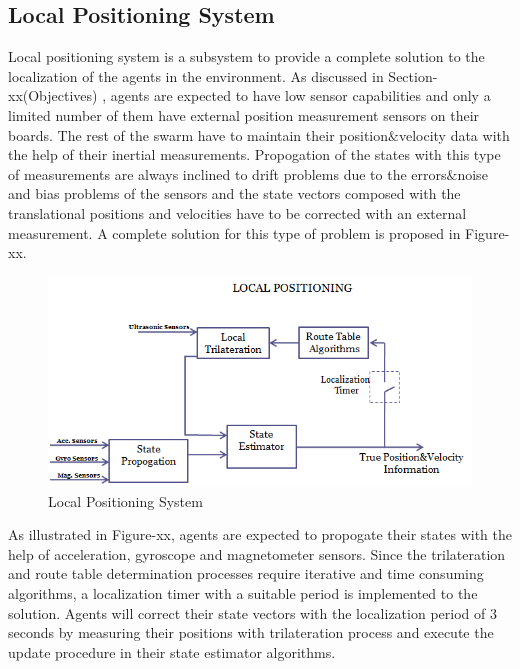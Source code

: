 \documentclass[twoside]{article}
\begin{document}
\subsection{Local Positioning System}

Local positioning system is a subsystem to provide a complete solution to the localization of the agents in the environment. As discussed in Section-xx(Objectives) , agents are expected to have low sensor capabilities and only a limited number of them have external position measurement sensors on their boards. The rest of the swarm have to maintain their position$\&$velocity data with the help of their inertial measurements. Propogation of the states with this type of measurements are always inclined to drift problems due to the errors$\&$noise and bias problems of the sensors and the state vectors composed with the translational positions and velocities have to be corrected with an external measurement. A complete solution for this type of problem is proposed in Figure-xx. 



\begin{figure}[H]
	\caption{Local Positioning System}
	\centering
	\includegraphics[scale = 0.65]{lps}
\end{figure}


As illustrated in Figure-xx, agents are expected to propogate their states with the help of acceleration, gyroscope and magnetometer sensors. Since the trilateration and route table determination processes require iterative and time consuming algorithms, a localization timer with a suitable period is implemented to the solution. Agents will correct their state vectors with the localization period of 3 seconds by measuring their positions with trilateration process and execute the update procedure in their state estimator algorithms. 
\end{document}
